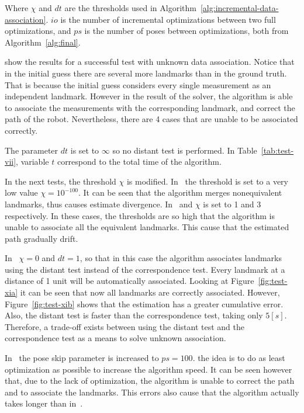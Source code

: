 Where $\chi$ and $dt$ are the thresholds used in Algorithm~\ref{alg:incremental-data-association}. $io$ is the number of incremental optimizations between two full optimizations, and $ps$ is the number of poses between optimizations, both from Algorithm~\ref{alg:final}.

 show the results for a successful test with unknown data association. Notice that in the initial guess there are several more landmarks than in the ground truth. That is because the initial guess considers every single measurement as an independent landmark. However in the result of the solver, the algorithm is able to associate the measurements with the corresponding landmark, and correct the path of the robot. Nevertheless, there are 4 cases that are unable to be associated correctly.

The parameter $dt$ is set to $\infty$ so no distant test is performed. In Table~\ref{tab:test-vii}, variable $t$ correspond to the total time of the algorithm. 

In the next tests, the threshold $\chi$ is modified. In~ the threshold is set to a very low value $\chi=10^{-100}$. It can be seen that the algorithm merges nonequivalent landmarks, thus causes estimate divergence.
In~ and  $\chi$ is set to 1 and 3 respectively. In these cases, the thresholds are so high that the algorithm is unable to associate all the equivalent landmarks. This cause that the estimated path gradually drift.

In~ $\chi=0$ and $dt=1$, so that in this case the algorithm associates landmarks using the distant test instead of the correspondence test. Every landmark at a distance of 1 unit will be automatically associated. Looking at Figure~\ref{fig:test-xia} it can be seen that now all landmarks are correctly associated. However, Figure~\ref{fig:test-xib} shows that the estimation has a greater cumulative error. Also, the distant test is faster than the correspondence test, taking only $5[s]$. Therefore, a trade-off exists between using the distant test and the correspondence test as a means to solve unknown association.

In~ the pose skip parameter is increased to $ps=100$. the idea is to do as least optimization as possible to increase the algorithm speed. It can be seen however that, due to the lack of optimization, the algorithm is unable to correct the path and to associate the landmarks. This errors also cause that the algorithm actually takes longer than in~. 

